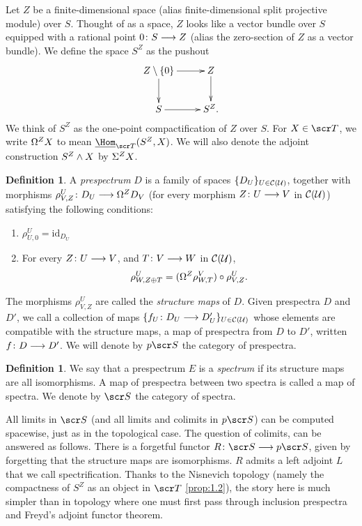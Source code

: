 \documentclass{amsart}
\theoremstyle{definition}
\newtheorem{defn}[thm]{Definition}
\begin{document}
Let $Z$ be a finite-dimensional space (alias finite-dimensional split projective module) over $S$. Thought of as a space, $Z$ looks like a vector bundle over $S$ equipped with a rational point $0 \colon S \longrightarrow Z$ (alias the zero-section of $Z$ as a vector bundle). We define the space $S^Z$ as the pushout \[\xymatrix{
Z \setminus \{0\} \ar[r] \ar[d] & Z \ar[d]\\
S \ar[r] & S^Z.
}\]
\noindent We think of $S^Z$ as the one-point compactification of $Z$ over $S$. For $X \in \sT$, we write $\Omega^Z X$ to mean $\underline{\Hom}_{\sT} (S^Z, X)$. We will also denote the adjoint construction $S^Z \wedge X$ by $\Sigma^{Z} X$.

\begin{defn}
A \emph{prespectrum} $D$ is a family of spaces $\{D_U\}_{U \in {\mathcal{C}}({\mathcal{U}})}$, together with morphisms $\rho^{U}_{V,Z} \colon D_U \longrightarrow \Omega^ZD_V$ (for every morphism $Z \colon U \longrightarrow V$ in ${\mathcal{C}}({\mathcal{U}})$) satisfying the following conditions:
\begin{enumerate}[label=\alph*)]
\item $\rho^{U}_{U,0} = \mathrm{id}_{D_U}$
\item For every $Z \colon U \longrightarrow V$, and $T \colon V \longrightarrow W$ in ${\mathcal{C}}({\mathcal{U}})$, \[\rho^U_{W, Z \oplus T} = (\Omega^Z \rho^{V}_{W,T}) \circ \rho^{U}_{V, Z}.\]
\end{enumerate}
\noindent The morphisms $\rho^{U}_{V,Z}$ are called the \emph{structure maps} of $D$. Given prespectra $D$ and $D'$, we call a collection of maps $\{f_U \colon D_U \longrightarrow D'_U\}_{U \in {\mathcal{C}}({\mathcal{U}})}$ whose elements are compatible with the structure maps, a map of prespectra from $D$ to $D'$, written $f \colon D \longrightarrow D'$. We will denote by $p\sS$ the category of prespectra.
\end{defn}

\begin{defn}\label{defn:spectra}
We say that a prespectrum $E$ is a \emph{spectrum} if its structure maps are all isomorphisms. A map of prespectra between two spectra is called a map of spectra. We denote by $\sS$ the category of spectra.
\end{defn}

All limits in $\sS$ (and all limits and colimits in $p\sS$) can be computed spacewise, just as in the topological case. The question of colimits, can be answered as follows. There is a forgetful functor $R \colon \sS \rtarr p\sS$, given by forgetting that the structure maps are isomorphisms. $R$ admits a left adjoint $L$ that we call spectrification. Thanks to the Nisnevich topology (namely the compactness of $S^Z$ as an object in $\sT$ \ref{prop:1.2}), the story here is much simpler than in topology where one must first pass through inclusion prespectra and Freyd's adjoint functor theorem.
\end{document}
